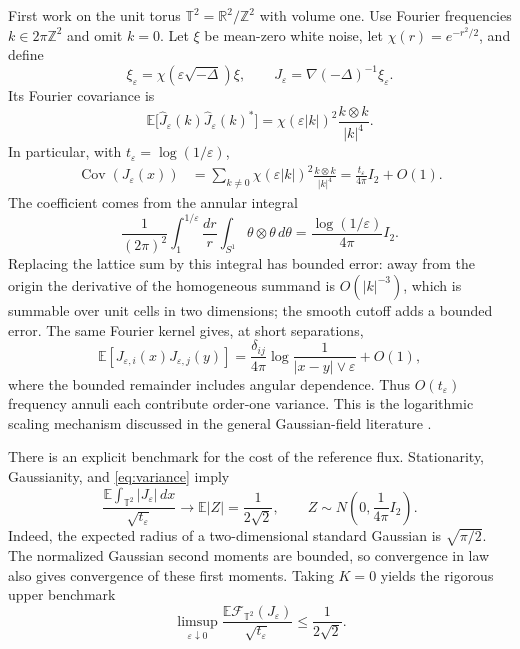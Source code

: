 \documentclass[11pt]{article}
\theoremstyle{definition}
\newcommand{\R}{\mathbb R}
\newcommand{\Z}{\mathbb Z}
\newcommand{\E}{\mathbb E}
\newcommand{\T}{\mathbb T}
\newcommand{\Cov}{\operatorname{Cov}}
\newcommand{\cF}{\mathcal F}
\newcommand{\dd}{\,dx}
\begin{document}
First work on the unit torus $\T^2=\R^2/\Z^2$ with volume one. Use Fourier
frequencies $k\in2\pi\Z^2$ and omit $k=0$. Let $\xi$ be mean-zero white
noise, let $\chi(r)=e^{-r^2/2}$, and define
\begin{equation}\label{eq:reference}
  \xi_\varepsilon=\chi(\varepsilon\sqrt{-\Delta})\xi,
  \qquad J_\varepsilon=\nabla(-\Delta)^{-1}\xi_\varepsilon.
\end{equation}
Its Fourier covariance is
\begin{equation}\label{eq:fourier}
  \E\bigl[\widehat J_\varepsilon(k)
      \widehat J_\varepsilon(k)^*\bigr]
  =\chi(\varepsilon|k|)^2\frac{k\otimes k}{|k|^4}.
\end{equation}
In particular, with $t_\varepsilon=\log(1/\varepsilon)$,
\begin{align}\label{eq:variance}
  \Cov(J_\varepsilon(x))
  &=\sum_{k\ne0}\chi(\varepsilon|k|)^2
        \frac{k\otimes k}{|k|^4}
    =\frac{t_\varepsilon}{4\pi}I_2+O(1).
\end{align}
The coefficient comes from the annular integral
\[
  \frac1{(2\pi)^2}\int_1^{1/\varepsilon}\frac{dr}{r}
            \int_{S^1}\theta\otimes\theta\,d\theta
  =\frac{\log(1/\varepsilon)}{4\pi}I_2.
\]
Replacing the lattice sum by this integral has bounded error: away from
the origin the derivative of the homogeneous summand is $O(|k|^{-3})$,
which is summable over unit cells in two dimensions; the smooth cutoff
adds a bounded error. The same Fourier kernel gives, at short separations,
\[
  \E[J_{\varepsilon,i}(x)J_{\varepsilon,j}(y)]
  =\frac{\delta_{ij}}{4\pi}
      \log\frac1{|x-y|\vee\varepsilon}+O(1),
\]
where the bounded remainder includes angular dependence. Thus
$O(t_\varepsilon)$ frequency annuli each contribute order-one variance.
This is the logarithmic scaling mechanism discussed in the general
Gaussian-field literature \cite{DRSV,LSSW}.

There is an explicit benchmark for the cost of the reference flux.
Stationarity, Gaussianity, and \eqref{eq:variance} imply
\begin{equation}\label{eq:linearbenchmark}
  \frac{\E\int_{\T^2}|J_\varepsilon|\dd}{\sqrt{t_\varepsilon}}
  \longrightarrow
  \E|Z|=\frac1{2\sqrt2},
  \qquad Z\sim N\!\left(0,\frac1{4\pi}I_2\right).
\end{equation}
Indeed, the expected radius of a two-dimensional standard Gaussian is
$\sqrt{\pi/2}$. The normalized Gaussian second moments are bounded, so
convergence in law also gives convergence of these first moments.
Taking $K=0$ yields the rigorous upper benchmark
\begin{equation}\label{eq:upper}
  \limsup_{\varepsilon\downarrow0}
  \frac{\E\cF_{\T^2}(J_\varepsilon)}{\sqrt{t_\varepsilon}}
  \leq\frac1{2\sqrt2}.
\end{equation}
\end{document}
